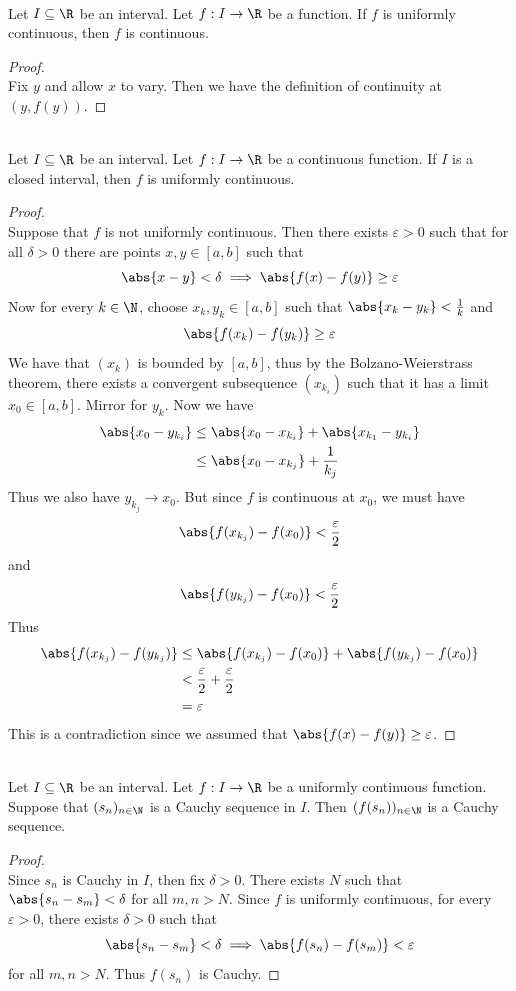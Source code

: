 \documentclass[a4paper]{article}
\begin{document}
\begin{prp}{}{}\\
Let $I\subseteq\R$ be an interval. Let $f:I\to\R$ be a function. If $f$ is uniformly continuous, then $f$ is continuous. 
\begin{proof}\\ Fix $y$ and allow $x$ to vary. Then we have the definition of continuity at $(y,f(y))$. 
\end{proof}
\end{prp}

\begin{prp}{}{}\\
Let $I\subseteq\R$ be an interval. Let $f:I\to\R$ be a continuous function. If $I$ is a closed interval, then $f$ is uniformly continuous. 
\begin{proof}\\ Suppose that $f$ is not uniformly continuous. Then there exists $\varepsilon>0$ such that for all $\delta>0$ there are points $x,y\in[a,b]$ such that $$\abs{x-y}<\delta\implies\abs{f(x)-f(y)}\geq\varepsilon$$ Now for every $k\in\N$, choose $x_k,y_k\in[a,b]$ such that $\abs{x_k-y_k}<\frac{1}{k}$ and $$\abs{f(x_k)-f(y_k)}\geq\varepsilon$$ We have that $(x_k)$ is bounded by $[a,b]$, thus by the Bolzano-Weierstrass theorem, there exists a convergent subsequence $(x_{k_i})$ such that it has a limit $x_0\in[a,b]$. Mirror for $y_k$. Now we have 
\begin{align*}
\abs{x_0-y_{k_i}}&\leq\abs{x_0-x_{k_i}}+\abs{x_{k_1}-y_{k_i}}\\
&\leq\abs{x_0-x_{k_j}}+\frac{1}{k_j}
\end{align*}
Thus we also have $y_{k_j}\to x_0$. But since $f$ is continuous at $x_0$, we must have $$\abs{f(x_{k_j})-f(x_0)}<\frac{\varepsilon}{2}$$ and $$\abs{f(y_{k_j})-f(x_0)}<\frac{\varepsilon}{2}$$ Thus
\begin{align*}
\abs{f(x_{k_j})-f(y_{k_j})}&\leq\abs{f(x_{k_j})-f(x_0)}+\abs{f(y_{k_j})-f(x_0)}\\
&<\frac{\varepsilon}{2}+\frac{\varepsilon}{2}\\
&=\varepsilon
\end{align*} This is a contradiction since we assumed that $\abs{f(x)-f(y)}\geq\varepsilon$. 
\end{proof}
\end{prp}

\begin{prp}{}{}\\
Let $I\subseteq\R$ be an interval. Let $f:I\to\R$ be a uniformly continuous function. Suppose that $(s_n)_{n\in\N}$ is a Cauchy sequence in $I$. Then $(f(s_n))_{n\in\N}$ is a Cauchy sequence. 
\begin{proof}\\ Since $s_n$ is Cauchy in $I$, then fix $\delta>0$. There exists $N$ such that $\abs{s_n-s_m}<\delta$ for all $m,n>N$. Since $f$ is uniformly continuous, for every $\varepsilon>0$, there exists $\delta>0$ such that $$\abs{s_n-s_m}<\delta\implies\abs{f(s_n)-f(s_m)}<\varepsilon$$ for all $m,n>N$. Thus $f(s_n)$ is Cauchy. 
\end{proof}
\end{prp}
\end{document}

